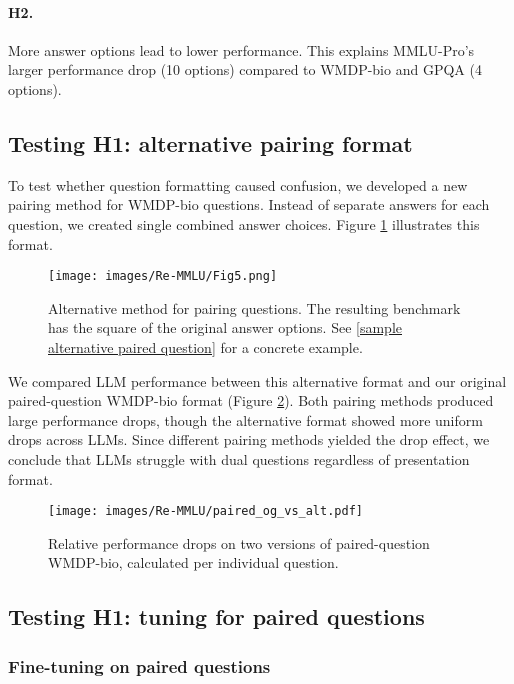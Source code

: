 \documentclass{article}
\begin{document}
\paragraph{H2.} More answer options lead to lower performance. This explains MMLU-Pro's larger performance drop (10 options) compared to WMDP-bio and GPQA (4 options).

\subsection{Testing H1: alternative pairing format}

To test whether question formatting caused confusion, we developed a new pairing method for WMDP-bio questions. Instead of separate answers for each question, we created single combined answer choices. Figure \ref{fig:alternative question pairing} illustrates this format.

\begin{figure}[H]
    \centering
    \texttt{[image: images/Re-MMLU/Fig5.png]}
    \caption{Alternative method for pairing questions. The resulting benchmark has the square of the original answer options. See \ref{sample alternative paired question} for a concrete example.}
    \label{fig:alternative question pairing}
\end{figure}

We compared LLM performance between this alternative format and our original paired-question WMDP-bio format (Figure \ref{fig:alternative question performance}). Both pairing methods produced large performance drops, though the alternative format showed more uniform drops across LLMs. Since different pairing methods yielded the drop effect, we conclude that LLMs struggle with dual questions regardless of presentation format.

\begin{figure}[H]
    \centering
    \texttt{[image: images/Re-MMLU/paired\_og\_vs\_alt.pdf]}
    \caption{Relative performance drops on two versions of paired-question WMDP-bio, calculated per individual question.}
    \label{fig:alternative question performance}
\end{figure}

\subsection{Testing H1: tuning for paired questions}

\FloatBarrier
\subsubsection{Fine-tuning on paired questions}
\end{document}
